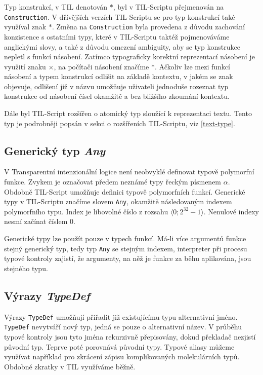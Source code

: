 Typ konstrukcí, v TIL denotován $*$, byl v TIL-Scriptu přejmenován na \lstinline{Construction}.
V dřívějších verzích TIL-Scriptu se pro typ konstrukcí také využíval znak $*$. Změna na
\lstinline{Construction} byla provedena z důvodu zachování konzistence s ostatními typy, které
v TIL-Scriptu taktéž pojmenováváme anglickými slovy, a také z důvodu omezení ambiguity, aby se typ
konstrukce nepletl s funkcí násobení. Zatímco typograficky korektní reprezentací násobení je
využití znaku $\times$, na počítači násobení značíme $*$. Ačkoliv lze mezi funkcí násobení a
typem konstrukcí odlišit na základě kontextu, v jakém se znak objevuje, odlišení již v názvu
umožňuje uživateli jednoduše rozeznat typ konstrukce od násobení čísel okamžitě a bez bližšího
zkoumání kontextu.

Dále byl TIL-Script rozšířen o atomický typ sloužící k reprezentaci textu. Tento typ je podrobněji
popsán v sekci o rozšířeních TIL-Scriptu, viz \ref{text-type}.

\subsection{Generický typ \textit{Any}}

V Transparentní intenzionální logice není neobvyklé definovat typově polymorfní funkce. Zvykem je
označovat předem neznámé typy řeckým písmenem $\alpha$. Obdobně TIL-Script umožňuje definici
typově polymorfních funkcí. Generické typy v TIL-Scriptu značíme slovem \lstinline{Any}, okamžitě
následovaným indexem polymorfního typu. Index je libovolné číslo z rozsahu
$\bigl \langle 0; 2^{32}-1 \bigr \rangle$. Nenulové indexy nesmí začínat číslem 0.

Generické typy lze použít pouze v typech funkcí. Má-li více argumentů funkce stejný generický
typ, tedy typ \lstinline{Any} se stejným indexem, interpreter při procesu typové kontroly zajistí,
že argumenty, na něž je funkce za běhu aplikována, jsou stejného typu.

\subsection{Výrazy \textit{TypeDef}}

Výrazy \lstinline{TypeDef} umožňují přiřadit již existujícímu typu alternativní jméno.
\lstinline{TypeDef} nevytváří nový typ, jedná se pouze o alternativní název. V průběhu typové
kontroly jsou tyto jména rekurzivně přepisovány, dokud překladač nezjistí původní typ. Teprve poté
porovnává původní typy. Typové aliasy můžeme využívat například pro zkrácení zápisu komplikovaných
molekulárních typů. Obdobné zkratky v TIL využíváme běžně.

